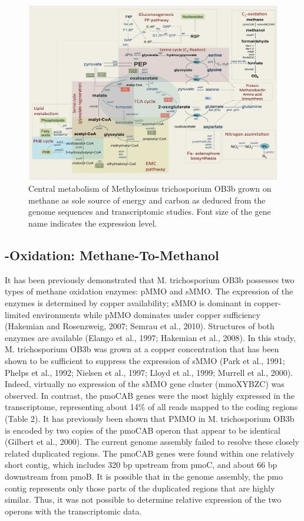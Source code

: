 \begin{figure}[H]
\centering
     \includegraphics[width=1.0\textwidth]{./tex/chapter1/figures/figure1.png}
     \caption{Central metabolism of Methylosinus trichosporium OB3b grown on methane as sole source of energy and carbon as
        deduced from the genome sequences and transcriptomic studies.
        Font size of the gene name indicates the expression level.}
     \label{fig:A_metabolic_map}
\end{figure}


\subsection{-Oxidation: Methane-To-Methanol}
It has been previously demonstrated that M. trichosporium OB3b possesses two types of methane oxidation enzymes: pMMO and sMMO.
The expression of the enzymes is determined by copper availability; sMMO is dominant in copper-limited environments while pMMO dominates under copper sufficiency (Hakemian and Rosenzweig, 2007; Semrau et al., 2010).
Structures of both enzymes are available (Elango et al., 1997; Hakemian et al., 2008).
In this study, M. trichosporium OB3b was grown at a copper concentration that has been shown to be sufficient to suppress the expression of sMMO (Park et al., 1991; Phelps et al., 1992; Nielsen et al., 1997; Lloyd et al., 1999; Murrell et al., 2000).
Indeed, virtually no expression of the sMMO gene cluster (mmoXYBZC) was observed.
In contrast, the pmoCAB genes were the most highly expressed in the transcriptome, representing about 14\% of all reads mapped to the coding regions (Table 2).
It has previously been shown that PMMO in M. trichosporium OB3b is encoded by two copies of the pmoCAB operon that appear to be identical (Gilbert et al., 2000).
The current genome assembly failed to resolve these closely related duplicated regions.
The pmoCAB genes were found within one relatively short contig, which includes 320 bp upstream from pmoC, and about 66 bp downstream from pmoB.
It is possible that in the genome assembly, the pmo contig represents only those parts of the duplicated regions that are highly similar.
Thus, it was not possible to determine relative expression of the two operons with the transcriptomic data.

